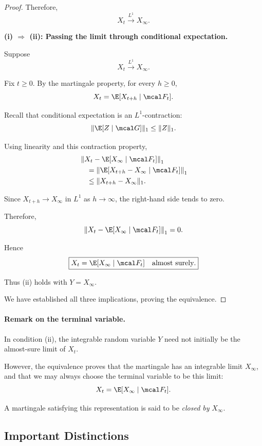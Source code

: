 \begin{proof}
Therefore,
\[
    X_t\xrightarrow{L^1}X_\infty.
\]

\medskip
\noindent
\textbf{(i) $\Rightarrow$ (ii):
Passing the limit through conditional expectation.}

Suppose
\[
    X_t\xrightarrow{L^1}X_\infty.
\]

Fix $t\geq0$. By the martingale property,
for every $h\geq0$,
\[
    X_t=\E[X_{t+h}\mid\mcal F_t].
\]

Recall that conditional expectation is an
$L^1$-contraction:
\[
    \|\E[Z\mid\mcal G]\|_1\leq\|Z\|_1.
\]

Using linearity and this contraction property,
\[
\begin{aligned}
    &\left\|
    X_t-\E[X_\infty\mid\mcal F_t]
    \right\|_1\\
    &\quad=
    \left\|
    \E[X_{t+h}-X_\infty\mid\mcal F_t]
    \right\|_1\\
    &\quad\leq
    \|X_{t+h}-X_\infty\|_1.
\end{aligned}
\]

Since $X_{t+h}\to X_\infty$ in $L^1$ as
$h\to\infty$, the right-hand side tends to zero.

Therefore,
\[
    \left\|
    X_t-\E[X_\infty\mid\mcal F_t]
    \right\|_1=0.
\]

Hence
\[
    \boxed{
    X_t=\E[X_\infty\mid\mcal F_t]
    \quad\text{almost surely}.
    }
\]

Thus (ii) holds with $Y=X_\infty$.

We have established all three implications, proving
the equivalence.
\end{proof}

\paragraph{Remark on the terminal variable.}
In condition (ii), the integrable random variable
$Y$ need not initially be the almost-sure limit
of $X_t$.

However, the equivalence proves that the martingale
has an integrable limit $X_\infty$, and that we may
always choose the terminal variable to be this limit:
\[
    X_t=\E[X_\infty\mid\mcal F_t].
\]

A martingale satisfying this representation is
said to be \emph{closed by} $X_\infty$.

\subsection{Important Distinctions}

